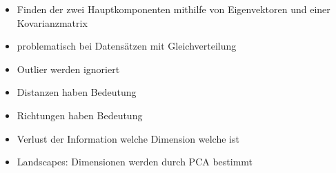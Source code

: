 \begin{itemize}
	\item Finden der zwei Hauptkomponenten mithilfe von Eigenvektoren und einer Kovarianzmatrix
	\item problematisch bei Datensätzen mit Gleichverteilung
	\item Outlier werden ignoriert
	\item Distanzen haben Bedeutung
	\item Richtungen haben Bedeutung
	\item Verlust der Information welche Dimension welche ist
	\item Landscapes: Dimensionen werden durch PCA bestimmt
\end{itemize}